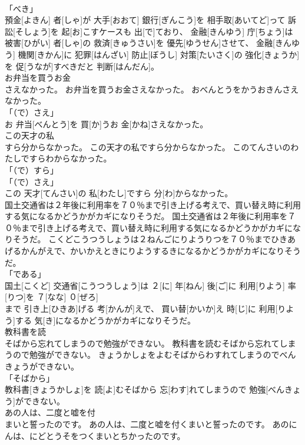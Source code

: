 \documentclass[8pt]{extreport}
\begin{document}
\begin{CJK}{UTF8}{min}
\\	「べき」 
\\	預金[よきん] 者[しゃ]が 大手[おおて] 銀行[ぎんこう]を 相手取[あいてど]って 訴訟[そしょう]を 起[お]こすケースも 出[で]ており、 金融[きんゆう] 庁[ちょう]は 被害[ひがい] 者[しゃ]の 救済[きゅうさい]を 優先[ゆうせん]させて、 金融[きんゆう] 機関[きかん]に 犯罪[はんざい] 防止[ぼうし] 対策[たいさく]の 強化[きょうか]を 促[うなが]すべきだと 判断[はんだん]。		
\\	お弁当を買うお金
\\	さえなかった。	お弁当を買うお金さえなかった。	おべんとうをかうおきんさえなかった。	
\\	「（で）さえ」 
\\	お 弁当[べんとう]を 買[か]うお 金[かね]さえなかった。		
\\	この天才の私
\\	すら分からなかった。	この天才の私ですら分からなかった。	このてんさいのわたしですらわからなかった。	
\\	「（で）すら」 
\\	「（で）さえ」 
\\	この 天才[てんさい]の 私[わたし]ですら 分[わ]からなかった。		
\\	国土交通省は２年後に利用率を７０％まで引き上げる考えで、買い替え時に利用する気になるかどうかがカギになりそうだ。	国土交通省は２年後に利用率を７０％まで引き上げる考えで、買い替え時に利用する気になるかどうかがカギになりそうだ。	こくどこうつうしょうは２ねんごにりようりつを７０％までひきあげるかんがえで、かいかえときにりようするきになるかどうかがカギになりそうだ。	
\\	「である」 
\\	国土[こくど] 交通省[こうつうしょう]は ２[に] 年[ねん] 後[ご]に 利用[りよう] 率[りつ]を ７[なな] ０[ぜろ] 
\\	[ぱーせんと]まで 引き上[ひきあ]げる 考[かんが]えで、 買い替[かいか]え 時[じ]に 利用[りよう]する 気[き]になるかどうかがカギになりそうだ。		
\\	教科書を読
\\	そばから忘れてしまうので勉強ができない。	教科書を読むそばから忘れてしまうので勉強ができない。	きょうかしょをよむそばからわすれてしまうのでべんきょうができない。	
\\	「そばから」 
\\	教科書[きょうかしょ]を 読[よ]むそばから 忘[わす]れてしまうので 勉強[べんきょう]ができない。		
\\	あの人は、二度と嘘を付
\\	まいと誓ったのです。	あの人は、二度と嘘を付くまいと誓ったのです。	あのにんは、にどとうそをつくまいとちかったのです。	

\end{CJK}
\end{document}

